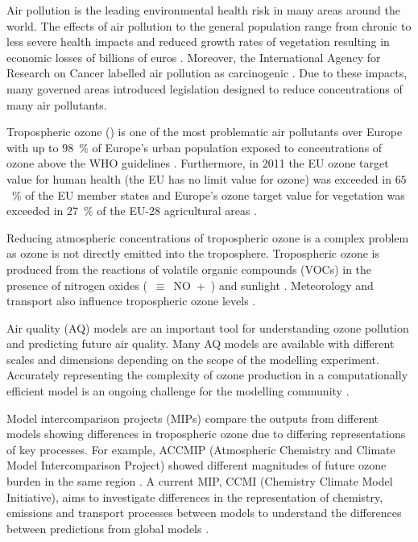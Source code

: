 Air pollution is the leading environmental health risk in many areas around the world.
The effects of air pollution to the general population range from chronic to less severe health impacts and reduced growth rates of vegetation resulting in economic losses of billions of euros \citep{AQEU:2015}.
Moreover, the International Agency for Research on Cancer labelled air pollution as carcinogenic \citep{IARC:2013}.
Due to these impacts, many governed areas introduced legislation designed to reduce concentrations of many air pollutants.

Tropospheric ozone () is one of the most problematic air pollutants over Europe with up to $98$~\% of Europe's urban population exposed to concentrations of ozone above the WHO guidelines \citep{AQEU:2015}.
Furthermore, in 2011 the EU ozone target value for human health (the EU has no limit value for ozone) was exceeded in $65$~\% of the EU member states and Europe's ozone target value for vegetation was exceeded in $27$~\% of the EU-28 agricultural areas \citep{AQEU:2013}.

Reducing atmospheric concentrations of tropospheric ozone is a complex problem as ozone is not directly emitted into the troposphere.
Tropospheric ozone is produced from the reactions of volatile organic compounds (VOCs) in the presence of nitrogen oxides \mbox{(~$\equiv$~NO + )} and sunlight \citep{Atkinson:2000}.
Meteorology and transport also influence tropospheric ozone levels \citep{Jacob:2009}.

Air quality (AQ) models are an important tool for understanding ozone pollution and predicting future air quality.
Many AQ models are available with different scales and dimensions depending on the scope of the modelling experiment.
Accurately representing the complexity of ozone production in a computationally efficient model is an ongoing challenge for the modelling community \citep{Russell:2000}.

Model intercomparison projects (MIPs) compare the outputs from different models showing differences in tropospheric ozone due to differing representations of key processes.
For example, ACCMIP (Atmospheric Chemistry and Climate Model Intercomparison Project) showed different magnitudes of future ozone burden in the same region \citep{Young:2013}.
A current MIP, CCMI (Chemistry Climate Model Initiative), aims to investigate differences in the representation of chemistry, emissions and transport processes between models to understand the differences between predictions from global models \citep{Eyring:2013}.

